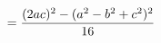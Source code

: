 \documentclass[preview]{standalone}
\begin{document}
\begin{align*}
\special{dvisvgm:raw <g id='unique000'>}= \frac{(2ac)^2 - (a^2-b^2+c^2)^2}{16}\special{dvisvgm:raw </g>}
\end{align*}
\end{document}
